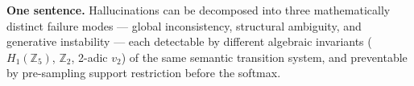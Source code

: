 \documentclass[11pt,a4paper]{article}
\begin{document}
\vspace{10pt}

\noindent
\colorbox{soft}{\parbox{\dimexpr\linewidth-2\fboxsep}{%
\vspace{6pt}
\textbf{One sentence.}
Hallucinations can be decomposed into three mathematically distinct failure
modes --- global inconsistency, structural ambiguity, and generative instability ---
each detectable by different algebraic invariants
($H_1(\mathbb{Z}_5)$, $\mathbb{Z}_2$, 2-adic $v_2$)
of the same semantic transition system,
and preventable by pre-sampling support restriction before the softmax.
\vspace{6pt}}}

\vspace{8pt}
\end{document}
